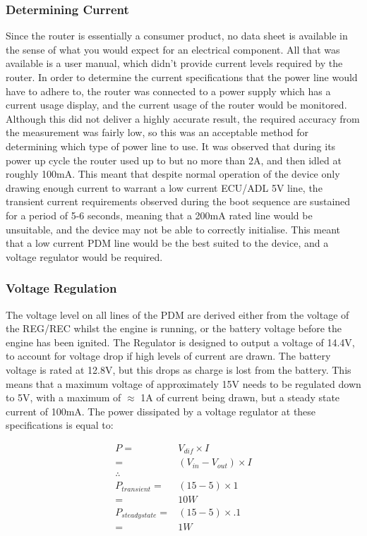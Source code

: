 \subsubsection{Determining Current}
Since the router is essentially a consumer product, no data sheet is available in the sense of what you would expect for an electrical component. All that was available is a user manual, which didn't provide current levels required by the router. In order to determine the current specifications that the power line would have to adhere to, the router was connected to a power supply which has a current usage display, and the current usage of the router would be monitored. Although this did not deliver a highly accurate result, the required accuracy from the measurement was fairly low, so this was an acceptable method for determining which type of power line to use. It was observed that during its power up cycle the router used up to but no more than 2A, and then idled at roughly 100mA. This meant that despite normal operation of the device only drawing enough current to warrant a low current ECU/ADL 5V line, the transient current requirements observed during the boot sequence are sustained for a period of 5-6 seconds, meaning that a 200mA rated line would be unsuitable, and the device may not be able to correctly initialise. This meant that a low current PDM line would be the best suited to the device, and a voltage regulator would be required.

\subsubsection{Voltage Regulation}
The voltage level on all lines of the PDM are derived either from the voltage of the REG/REC whilst the engine is running, or the battery voltage before the engine has been ignited. The Regulator is designed to output a voltage of 14.4V, to account for voltage drop if high levels of current are drawn. The battery voltage is rated at 12.8V, but this drops as charge is lost from the battery. This means that a maximum voltage of approximately 15V needs to be regulated down to 5V, with a maximum of $\approx$ 1A of current being drawn, but a steady state current of 100mA. The power dissipated by a voltage regulator at these specifications is equal to:

\begin{align}
P = &V_{dif}\times I\\
= &(V_{in} - V_{out})\times I\\
\therefore \nonumber\\
P_{transient} = &(15 - 5) \times 1\nonumber \\
= &10W\\
P_{steady state} = &(15 - 5) \times .1\nonumber \\
= &1W
\end{align}

